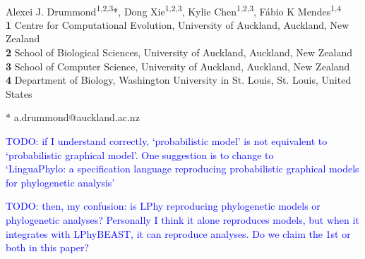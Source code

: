 \documentclass[10pt,letterpaper,table]{article}
\begin{document}
\vspace*{0.2in}

\begin{flushleft}
{\Large
\textbf{} %
}
\newline
\\
Alexei J. Drummond\textsuperscript{1,2,3}*,
Dong Xie\textsuperscript{1,2,3},
Kylie Chen\textsuperscript{1,2,3},
F\'{a}bio K Mendes\textsuperscript{1,4}
\\
\bigskip
\textbf{1} Centre for Computational Evolution, University of Auckland, Auckland, New Zealand
\\
\textbf{2} School of Biological Sciences, University of Auckland, Auckland, New Zealand
\\
\textbf{3} School of Computer Science, University of Auckland, Auckland, New Zealand
\\
\textbf{4} Department of Biology, Washington University in St. Louis, St. Louis, United States
\\
\bigskip

% 
%

* a.drummond@auckland.ac.nz

\end{flushleft}

\textcolor{blue}{TODO: if I understand correctly, `probabilistic model' is not equivalent to `probabilistic graphical model'. One suggestion is to change to \\ `LinguaPhylo: a specification language reproducing probabilistic graphical models for phylogenetic analysis'}

\textcolor{blue}{TODO: then, my confusion: is LPhy reproducing phylogenetic models or phylogenetic analyses? Personally I think it alone reproduces models, but when it integrates with LPhyBEAST, it can reproduce analyses. Do we claim the 1st or both in this paper?}
\end{document}
